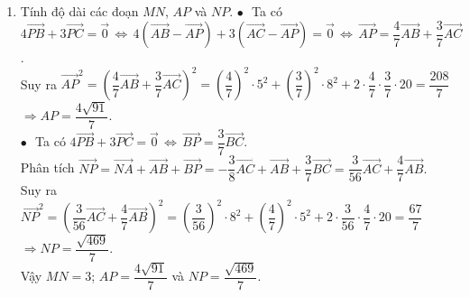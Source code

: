 \begin{bt}
{\begin{enumerate}
			\item Tính độ dài các đoạn $MN$, $AP$ và $NP$.
			$\bullet\,\,$ Ta có $4\vec{PB}+3\vec{PC}=\vec{0} \,\Leftrightarrow\, 4\left(\vec{AB}-\vec{AP}\right)+3\left(\vec{AC}-\vec{AP}\right)=\vec{0}
			\,\Leftrightarrow\, \vec{AP}=\dfrac{4}{7}\vec{AB}+\dfrac{3}{7}\vec{AC}$.\\
			Suy ra ${\vec{AP}}^2=\left(\dfrac{4}{7}\vec{AB}+\dfrac{3}{7}\vec{AC}\right)^2
			=\left(\dfrac{4}{7}\right)^2\cdot 5^2
			+\left(\dfrac{3}{7}\right)^2\cdot 8^2
			+2\cdot\dfrac{4}{7}\cdot \dfrac{3}{7} \cdot 20= \dfrac{208}{7}$\\
			$\Rightarrow AP = \dfrac{4\sqrt{91}}{7}.$
			\\
			$\bullet\,\,$ Ta có $4\vec{PB}+3\vec{PC}=\vec{0} \,\Leftrightarrow\, \vec{BP}=\dfrac{3}{7}\vec{BC}$.\\
			Phân tích 
			$\vec{NP}=\vec{NA}+\vec{AB}+\vec{BP}=-\dfrac{3}{8}\vec{AC}+\vec{AB}+\dfrac{3}{7}\vec{BC}=\dfrac{3}{56}\vec{AC}+\dfrac{4}{7}\vec{AB}.$\\
			Suy ra ${\vec{NP}}^2=\left(\dfrac{3}{56}\vec{AC}+\dfrac{4}{7}\vec{AB}\right)^2
			=\left(\dfrac{3}{56}\right)^2\cdot 8^2
			+\left(\dfrac{4}{7}\right)^2\cdot 5^2
			+2\cdot\dfrac{3}{56}\cdot \dfrac{4}{7} \cdot 20= \dfrac{67}{7}$\\
			$\Rightarrow NP = \dfrac{\sqrt{469}}{7}.$\\[1.5mm]
			Vậy $MN = 3$; $AP=\dfrac{4\sqrt{91}}{7}$ và $NP=\dfrac{\sqrt{469}}{7}$.
		\end{enumerate}
	}
\end{bt}
